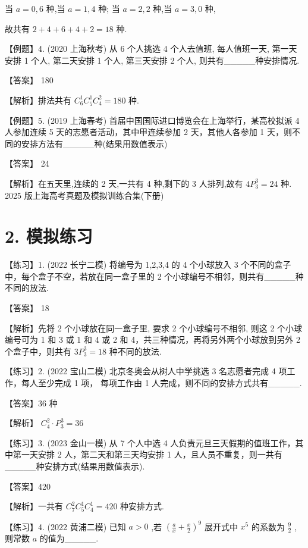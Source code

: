 \documentclass[10pt]{article}
\begin{document}
当 \(a = 0,6\) 种,当 \(a = 1,4\) 种; 当 \(a = 2,2\) 种,当 \(a = 3,0\) 种,

故共有 \(2 + 4 + 6 + 4 + 2 = {18}\) 种.

【例题】4. (2020 上海秋考) 从 6 个人挑选 4 个人去值班, 每人值班一天, 第一天安排 1 个人, 第二天安排 1 个人, 第三天安排 2 个人, 则共有\_\_\_\_\_种安排情况.

【答案】 180

【解析】排法共有 \({C}_{6}^{1}{C}_{5}^{1}{C}_{4}^{2} = {180}\) 种.

【例题】5. (2019 上海春考) 首届中国国际进口博览会在上海举行，某高校拟派 4 人参加连续 5 天的志愿者活动，其中甲连续参加 2 天，其他人各参加 1 天，则不同的安排方法有\_\_\_\_\_种(结果用数值表示)

【答案】 24

【解析】在五天里,连续的 2 天,一共有 4 种,剩下的 3 人排列,故有 \(4{P}_{3}^{3} = {24}\) 种. 2025 版上海高考真题及模拟训练合集(下册)

\section*{2. 模拟练习}

【练习】1. (2022 长宁二模) 将编号为 1,2,3,4 的 4 个小球放入 3 个不同的盒子中，每个盒子不空，若放在同一盒子里的 2 个小球编号不相邻，则共有\_\_\_\_\_种不同的放法.

【答案】 18

【解析】先将 2 个小球放在同一盒子里, 要求 2 个小球编号不相邻, 则这 2 个小球编号可为 1 和 3 或 1 和 4 或 2 和 4，共三种情况，再将另外两个小球放到另外 2 个盒子中，则共有 \(3{P}_{3}^{3} = {18}\) 种不同的放法.

【练习】2. (2022 宝山二模) 北京冬奥会从树人中学挑选 3 名志愿者完成 4 项工作，每人至少完成 1 项， 每项工作由 1 人完成，则不同的安排方式共有\_\_\_\_\_.

【答案】36 种

【解析】 \({C}_{4}^{2} \cdot  {P}_{3}^{3} = {36}\)

【练习】3. (2023 金山一模) 从 7 个人中选 4 人负责元旦三天假期的值班工作，其中第一天安排 2 人，第二天和第三天均安排 1 人，且人员不重复，则一共有\_\_\_\_\_种安排方式(结果用数值表示).

【答案】420

【解析】一共有 \({C}_{7}^{2}{C}_{5}^{1}{C}_{4}^{1} = {420}\) 种安排方式.

【练习】4. (2022 黄浦二模) 已知 \(a > 0\) ,若 \({\left( \frac{a}{x} + \frac{x}{2}\right) }^{9}\) 展开式中 \({x}^{5}\) 的系数为 \(\frac{9}{2}\) ,则常数 \(a\) 的值为\_\_\_\_\_.
\end{document}
